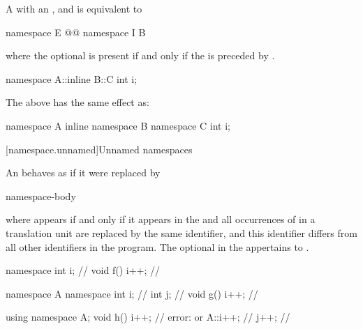 \pnum
A  with an
 ,
  and
 
is equivalent to
\begin{codeblock}
namespace E { @@ namespace I { B } }
\end{codeblock}
where the optional  is present if and only if
the   is preceded by .
\begin{example}
\begin{codeblock}
namespace A::inline B::C {
  int i;
}
\end{codeblock}
The above has the same effect as:
\begin{codeblock}
namespace A {
  inline namespace B {
    namespace C {
      int i;
    }
  }
}
\end{codeblock}
\end{example}

[namespace.unnamed]{Unnamed namespaces}%

\pnum
An  behaves as if it were
replaced by
\begin{ncsimplebnf}
   \terminal{\{}  \terminal{\}}\br
{}   \terminal{;}\br
{}  \terminal{\{} namespace-body \terminal{\}}
\end{ncsimplebnf}
where
 appears if and only if it appears in the
and all occurrences of  in a translation unit are replaced by
the same identifier, and this identifier differs from all other
identifiers in the program.
The optional 
in the 
appertains to .
\begin{example}
\begin{codeblock}
namespace { int i; }            // 
void f() { i++; }               // 

namespace A {
  namespace {
    int i;                      // 
    int j;                      // 
  }
  void g() { i++; }             // 
}

using namespace A;
void h() {
  i++;                          // error:  or 
  A::i++;                       // 
  j++;                          // 
}
\end{codeblock}
\end{example}

